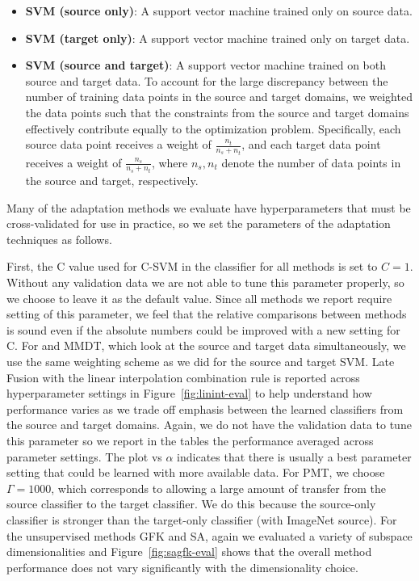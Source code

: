 \begin{itemize}
  \item{\textbf{SVM (source only)}: A support vector machine trained only on
    source data. 
}
  \item{\textbf{SVM (target only)}: A support vector machine trained only on
    target data.}
  \item{\textbf{SVM (source and target)}: A support vector machine trained on
  both source and target data. To account for the large discrepancy between the
  number of training data points in the source and target domains, we weighted
  the data points such that the constraints from the source and target domains
  effectively contribute equally to the optimization problem.  Specifically,
  each source data point receives a weight of $\frac{n_t}{n_s+n_t}$, and each target
  data point receives a weight of $\frac{n_s}{n_s+n_t}$, where $n_s,n_t$ denote the
  number of data points in the source and target, respectively.}
\end{itemize}

Many of the adaptation methods we evaluate have hyperparameters that must be
cross-validated for use in practice, so we set the parameters of the adaptation
techniques as follows.

First, the C value used for C-SVM in the classifier for all methods is set to $C=1$. Without any validation data we are not able to tune this parameter properly, so we choose to leave it as the default value. Since all methods we report require setting of this parameter, we feel that the relative comparisons between methods is sound even if the absolute numbers could be improved with a new setting for C.
  For \daume and MMDT, which look at the source and target data
  simultaneously, we use the same weighting scheme as we did for the source and
  target SVM.
  Late Fusion with the linear interpolation combination rule is reported across hyperparameter settings in Figure~\ref{fig:linint-eval} to help understand how performance varies as we trade off emphasis between the learned classifiers from the source and target domains. Again, we do not have the validation data to tune this parameter so we report in the tables the performance averaged across parameter settings. The plot vs $\alpha$ indicates that there is usually a best parameter setting that could be learned with more available data.
  For PMT, we choose $\Gamma=1000$, which corresponds to allowing a large amount of transfer from the source classifier to the target classifier. We do this because the source-only classifier is
  stronger than the target-only classifier (with ImageNet source). 
  For the unsupervised methods GFK and SA, again we evaluated a variety of
  subspace dimensionalities and Figure~\ref{fig:sagfk-eval} shows that the overall method performance does not vary significantly with the dimensionality choice.

